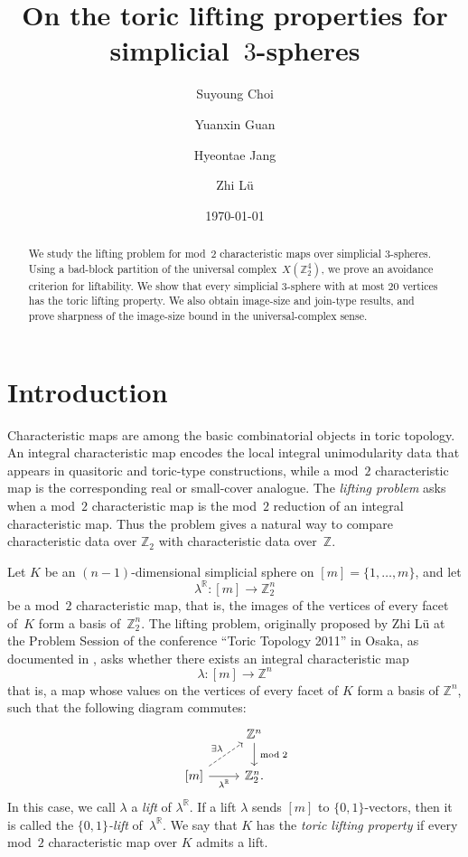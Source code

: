 \documentclass{amsart}
\title{On the toric lifting properties for simplicial~$3$-spheres}
\date{\today}
\author[S. Choi]{Suyoung Choi}
\author[Y. Guan]{Yuanxin Guan}
\author[H. Jang]{Hyeontae Jang}
\author[Z. L\"u]{Zhi L\"u}
\newcommand{\Z}{\mathbb{Z}}
\newcommand{\R}{\mathbb{R}}
\theoremstyle{definition}
\theoremstyle{remark}
\begin{document}
\begin{abstract}
    We study the lifting problem for mod~$2$ characteristic maps over simplicial $3$-spheres. 
    Using a bad-block partition of the universal complex~$X(\Z_2^4)$, we prove an avoidance criterion for liftability. 
    We show that every simplicial $3$-sphere with at most $20$ vertices has the toric lifting property. 
    We also obtain image-size and join-type results, and prove sharpness of the image-size bound in the universal-complex sense.
\end{abstract}

\maketitle


\section{Introduction}

Characteristic maps are among the basic combinatorial objects in toric topology.
An integral characteristic map encodes the local integral unimodularity data that appears in quasitoric and toric-type constructions, while a mod~$2$ characteristic map is the corresponding real or small-cover analogue.
The \emph{lifting problem} asks when a mod~$2$ characteristic map is the mod~$2$  reduction of an integral characteristic map.
Thus the problem gives a natural way to compare characteristic data over $\Z_2$ with characteristic data over~$\Z$.

Let $K$ be an $(n-1)$-dimensional simplicial sphere on $[m]=\{1,\ldots,m\}$, and let
$$
    \lambda^\R\colon [m]\longrightarrow \Z_2^n
$$
be a mod~$2$ characteristic map, that is, the images of the vertices of every facet of~$K$ form a basis of~$\Z_2^n$.
The lifting problem, originally proposed by Zhi L\"u at the Problem Session of the conference ``Toric
Topology 2011'' in Osaka, as documented in \cite{Choi-Park2016Wedge}, asks whether there exists an integral characteristic map
$$
    \lambda\colon [m]\longrightarrow \Z^n
$$
that is, a map whose values on the vertices of every facet of $K$ form a basis of $\Z^n$,
such that the following diagram commutes:
$$
    \begin{tikzcd}
        & \Z^n \arrow[d, "\bmod 2"] \\
        \left[m \right] \arrow[ur, "\exists \lambda", dashed] \arrow[r, "\lambda^{\R}"'] & \Z_2^n.
    \end{tikzcd}
$$
In this case, we call $\lambda$ a \emph{lift} of $\lambda^\R$.
If a lift $\lambda$ sends $[m]$ to $\{0,1\}$-vectors, then it is called the \emph{$\{0,1\}$-lift} of~$\lambda^\R$.
We say that $K$ has the \emph{toric lifting property} if every mod~$2$ characteristic map over $K$ admits a lift.
\end{document}
